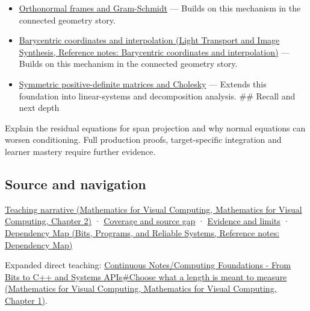 \begin{itemize}
\tightlist
\item
  \hyperref[appendix-c39f1ed34271]{Orthonormal frames and Gram-Schmidt} --- Builds on this mechanism in the connected geometry story.
\item
  \href{../04-Light-Transport-and-Image-Synthesis/main.pdf\#nameddest=appendix-02b9d9a81dca}{Barycentric coordinates and interpolation (Light Transport and Image Synthesis, Reference notes: Barycentric coordinates and interpolation)} --- Builds on this mechanism in the connected geometry story.
\item
  \hyperref[appendix-50d2ea3c9b26]{Symmetric positive-definite matrices and Cholesky} --- Extends this foundation into linear-systems and decomposition analysis. \#\# Recall and next depth
\end{itemize}

Explain the residual equations for span projection and why normal equations can worsen conditioning. Full production proofs, target-specific integration and learner mastery require further evidence.

\subsection{Source and navigation}\label{appendix-3b863809f82a-source-and-navigation}

\href{../02-Mathematics-for-Visual-Computing/main.pdf\#nameddest=01-foundations-i-ch018-a-gram-matrix-remembers-the-geometry-of-a-slanted-basis}{Teaching narrative (Mathematics for Visual Computing, Mathematics for Visual Computing, Chapter 2)} · \hyperref[appendix-fd090d982a15-phase-6---parts-501-600]{Coverage and source gap} · \hyperref[appendix-a103e7846d21-phase-6---source-analysis-and-verification]{Evidence and limits} · \href{../01-Bits-Programs-and-Reliable-Systems/main.pdf\#nameddest=appendix-4ad47bdd269a}{Dependency Map (Bits, Programs, and Reliable Systems, Reference notes: Dependency Map)}

Expanded direct teaching: \href{../02-Mathematics-for-Visual-Computing/main.pdf\#nameddest=01-foundations-i-ch017-choose-what-a-length-is-meant-to-measure}{Continuous Notes/Computing Foundations - From Bits to C++ and Systems APIs\#Choose what a length is meant to measure (Mathematics for Visual Computing, Mathematics for Visual Computing, Chapter 1)}.
